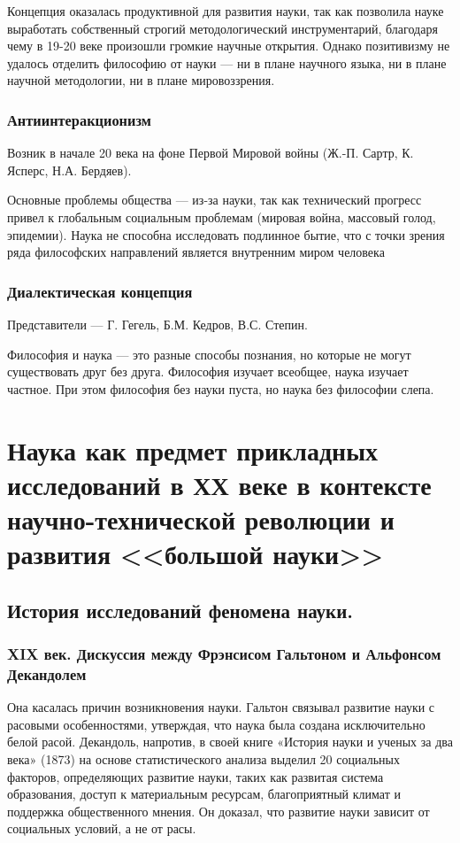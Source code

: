 Концепция оказалась продуктивной для развития науки, так как позволила науке выработать собственный строгий методологический инструментарий, благодаря чему в 19-20 веке произошли громкие научные открытия. 
Однако позитивизму не удалось отделить философию от науки — ни в плане научного языка, ни в плане научной методологии, ни в плане мировоззрения. 

\subsubsection{Антиинтеракционизм}

Возник в начале 20 века на фоне Первой Мировой войны (Ж.-П. Сартр, К. Ясперс, Н.А. Бердяев). 

Основные проблемы общества — из-за науки, так как технический прогресс привел к глобальным социальным проблемам (мировая война, массовый голод, эпидемии).
Наука не способна исследовать подлинное бытие, что с точки зрения ряда философских направлений является внутренним миром человека 

\subsubsection{Диалектическая концепция}

Представители — Г. Гегель, Б.М. Кедров, В.С. Степин.

Философия и наука — это разные способы познания, но которые не могут существовать друг без друга. Философия изучает всеобщее, наука изучает частное. При этом философия без науки пуста, но наука без философии слепа.


\section {Наука как предмет прикладных исследований в ХХ веке в контексте научно-технической революции и развития <<большой науки>>}

\subsection{История исследований феномена науки.}

\subsubsection{XIX век. Дискуссия между Фрэнсисом Гальтоном и Альфонсом Декандолем}

Она касалась причин возникновения науки. Гальтон связывал развитие науки с расовыми особенностями, утверждая, что наука была создана исключительно белой расой. Декандоль, напротив, в своей книге «История науки и ученых за два века» (1873) на основе статистического анализа выделил 20 социальных факторов, определяющих развитие науки, таких как развитая система образования, доступ к материальным ресурсам, благоприятный климат и поддержка общественного мнения. Он доказал, что развитие науки зависит от социальных условий, а не от расы.

